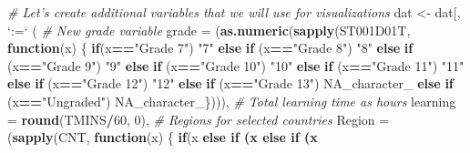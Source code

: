 \documentclass[]{book}
\newenvironment{Shaded}{\begin{snugshade}}{\end{snugshade}}
\newcommand{\CommentTok}[1]{\textcolor[rgb]{0.56,0.35,0.01}{\textit{#1}}}
\newcommand{\ControlFlowTok}[1]{\textcolor[rgb]{0.13,0.29,0.53}{\textbf{#1}}}
\newcommand{\DataTypeTok}[1]{\textcolor[rgb]{0.13,0.29,0.53}{#1}}
\newcommand{\DecValTok}[1]{\textcolor[rgb]{0.00,0.00,0.81}{#1}}
\newcommand{\KeywordTok}[1]{\textcolor[rgb]{0.13,0.29,0.53}{\textbf{#1}}}
\newcommand{\NormalTok}[1]{#1}
\newcommand{\OperatorTok}[1]{\textcolor[rgb]{0.81,0.36,0.00}{\textbf{#1}}}
\newcommand{\OtherTok}[1]{\textcolor[rgb]{0.56,0.35,0.01}{#1}}
\newcommand{\StringTok}[1]{\textcolor[rgb]{0.31,0.60,0.02}{#1}}
\begin{document}
\begin{Shaded}
\begin{Highlighting}[]
\CommentTok{# Let's create additional variables that we will use for visualizations}
\NormalTok{dat <-}\StringTok{ }\NormalTok{dat[, }\StringTok{`}\DataTypeTok{:=}\StringTok{`}\NormalTok{ (}
  \CommentTok{# New grade variable}
  \DataTypeTok{grade =}\NormalTok{ (}\KeywordTok{as.numeric}\NormalTok{(}\KeywordTok{sapply}\NormalTok{(ST001D01T, }\ControlFlowTok{function}\NormalTok{(x) \{}
  \ControlFlowTok{if}\NormalTok{(x}\OperatorTok{==}\StringTok{"Grade 7"}\NormalTok{) }\StringTok{"7"}
  \ControlFlowTok{else} \ControlFlowTok{if}\NormalTok{ (x}\OperatorTok{==}\StringTok{"Grade 8"}\NormalTok{) }\StringTok{"8"}
  \ControlFlowTok{else} \ControlFlowTok{if}\NormalTok{ (x}\OperatorTok{==}\StringTok{"Grade 9"}\NormalTok{) }\StringTok{"9"}
  \ControlFlowTok{else} \ControlFlowTok{if}\NormalTok{ (x}\OperatorTok{==}\StringTok{"Grade 10"}\NormalTok{) }\StringTok{"10"}
  \ControlFlowTok{else} \ControlFlowTok{if}\NormalTok{ (x}\OperatorTok{==}\StringTok{"Grade 11"}\NormalTok{) }\StringTok{"11"}
  \ControlFlowTok{else} \ControlFlowTok{if}\NormalTok{ (x}\OperatorTok{==}\StringTok{"Grade 12"}\NormalTok{) }\StringTok{"12"}
  \ControlFlowTok{else} \ControlFlowTok{if}\NormalTok{ (x}\OperatorTok{==}\StringTok{"Grade 13"}\NormalTok{) }\OtherTok{NA_character_}
  \ControlFlowTok{else} \ControlFlowTok{if}\NormalTok{ (x}\OperatorTok{==}\StringTok{"Ungraded"}\NormalTok{) }\OtherTok{NA_character_}\NormalTok{\}))),}
  \CommentTok{# Total learning time as hours}
  \DataTypeTok{learning =} \KeywordTok{round}\NormalTok{(TMINS}\OperatorTok{/}\DecValTok{60}\NormalTok{, }\DecValTok{0}\NormalTok{),}
  \CommentTok{# Regions for selected countries}
  \DataTypeTok{Region =}\NormalTok{ (}\KeywordTok{sapply}\NormalTok{(CNT, }\ControlFlowTok{function}\NormalTok{(x) \{}
  \ControlFlowTok{if}\NormalTok{(x }\OperatorTok{%in%}\StringTok{ }\KeywordTok{c}\NormalTok{(}\StringTok{"Canada"}\NormalTok{, }\StringTok{"United States"}\NormalTok{, }\StringTok{"Mexico"}\NormalTok{)) }\StringTok{"N. America"}
    \ControlFlowTok{else} \ControlFlowTok{if}\NormalTok{ (x }\OperatorTok{%in%}\StringTok{ }\KeywordTok{c}\NormalTok{(}\StringTok{"Colombia"}\NormalTok{, }\StringTok{"Brazil"}\NormalTok{, }\StringTok{"Uruguay"}\NormalTok{)) }\StringTok{"S. America"}
    \ControlFlowTok{else} \ControlFlowTok{if}\NormalTok{ (x }\OperatorTok{%in%}\StringTok{ }\KeywordTok{c}\NormalTok{(}\StringTok{"Japan"}\NormalTok{, }\StringTok{"B-S-J-G (China)"}\NormalTok{, }\StringTok{"Korea"}\NormalTok{)) }\StringTok{"Asia"}
}}}
\end{Highlighting}
\end{Shaded}
\end{document}
